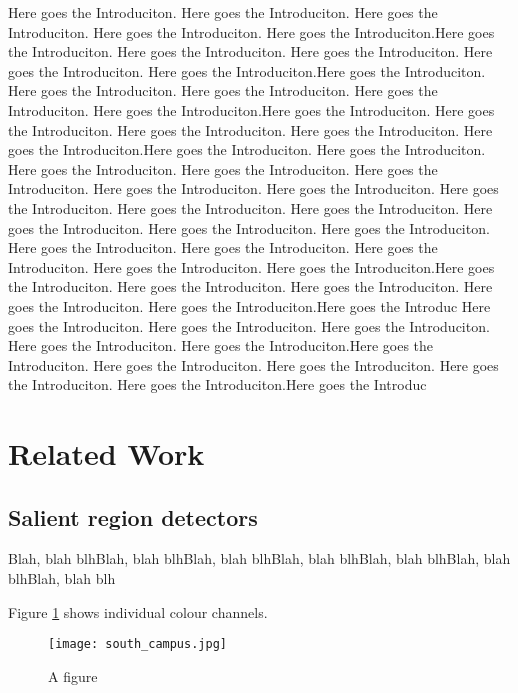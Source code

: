 \documentclass[a4paper,11pt]{article}
\begin{document}
Here goes the Introduciton. Here goes the Introduciton. Here goes the Introduciton. Here goes the Introduciton. Here goes the Introduciton.Here goes the Introduciton. Here goes the Introduciton. Here goes the Introduciton. Here goes the Introduciton. Here goes the Introduciton.Here goes the Introduciton. Here goes the Introduciton. Here goes the Introduciton. Here goes the Introduciton. Here goes the Introduciton.Here goes the Introduciton. Here goes the Introduciton. Here goes the Introduciton. Here goes the Introduciton. Here goes the Introduciton.Here goes the Introduciton. Here goes the Introduciton. Here goes the Introduciton. Here goes the Introduciton. Here goes the Introduciton. Here goes the Introduciton. Here goes the Introduciton. Here goes the Introduciton. Here goes the Introduciton. Here goes the Introduciton. Here goes the Introduciton. Here goes the Introduciton. Here goes the Introduciton.
Here goes the Introduciton. Here goes the Introduciton. Here goes the Introduciton. Here goes the Introduciton. Here goes the Introduciton.Here goes the Introduciton. Here goes the Introduciton. Here goes the Introduciton. Here goes the Introduciton. Here goes the Introduciton.Here goes the Introduc
Here goes the Introduciton. Here goes the Introduciton. Here goes the Introduciton. Here goes the Introduciton. Here goes the Introduciton.Here goes the Introduciton. Here goes the Introduciton. Here goes the Introduciton. Here goes the Introduciton. Here goes the Introduciton.Here goes the Introduc
\section{Related Work}

\subsection{Salient region detectors}
Blah, blah blhBlah, blah blhBlah, blah blhBlah, blah blhBlah, blah blhBlah, blah blhBlah, blah blh

Figure \ref{fig:myfig} shows individual colour channels. 
\begin{figure}[!ht]
\begin{center}
\texttt{[image: south\_campus.jpg]}
\end{center}
\vspace{-20pt}
  \caption{A figure}\label{fig:myfig}
  \vspace{-10pt}
\end{figure}
\end{document}
